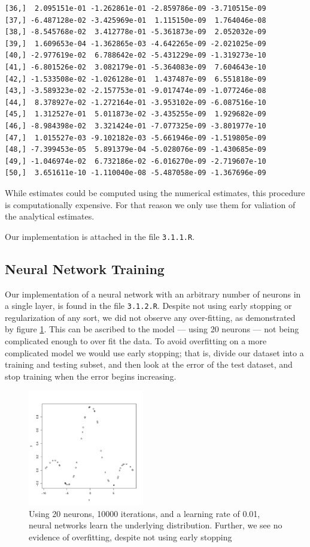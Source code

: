\documentclass[11pt]{article}
\begin{document}
\begin{lstlisting}
[36,]  2.095151e-01 -1.262861e-01 -2.859786e-09 -3.710515e-09
[37,] -6.487128e-02 -3.425969e-01  1.115150e-09  1.764046e-08
[38,] -8.545768e-02  3.412778e-01 -5.361873e-09  2.052032e-09
[39,]  1.609653e-04 -1.362865e-03 -4.642265e-09 -2.021025e-09
[40,] -2.977619e-02  6.788642e-02 -5.431229e-09 -1.319273e-10
[41,] -6.801526e-02  3.082179e-01 -5.364083e-09  7.604643e-10
[42,] -1.533508e-02 -1.026128e-01  1.437487e-09  6.551818e-09
[43,] -3.589323e-02 -2.157753e-01 -9.017474e-09 -1.077246e-08
[44,]  8.378927e-02 -1.272164e-01 -3.953102e-09 -6.087516e-10
[45,]  1.312527e-01  5.011873e-02 -3.435255e-09  1.929682e-09
[46,] -8.984398e-02  3.321424e-01 -7.077325e-09 -3.801977e-10
[47,]  1.015527e-03 -9.102182e-03 -5.661946e-09 -1.519805e-09
[48,] -7.399453e-05  5.891379e-04 -5.028076e-09 -1.430685e-09
[49,] -1.046974e-02  6.732186e-02 -6.016270e-09 -2.719607e-10
[50,]  3.651611e-10 -1.110040e-08 -5.487058e-09 -1.367696e-09
\end{lstlisting}
While estimates could be computed using the numerical estimates, this procedure is computationally expensive. For that reason we only use them for valiation of the analytical estimates. 

Our implementation is attached in the file \texttt{3.1.1.R}.

\subsection{Neural Network Training}
Our implementation of a neural network with an arbitrary number of neurons in a single layer, is found in the file \texttt{3.1.2.R}. Despite not using early stopping or regularization of any sort, we did not observe any over-fitting, as demonstrated by figure \ref{goodplot}. This can be ascribed to the model --- using 20 neurons --- not being complicated enough to over fit the data. To avoid overfitting on a more complicated model we would use early stopping; that is, divide our dataset into a training and testing subset, and then look at the error of the test dataset, and stop training when the error begins increasing. 

\begin{figure}[h!]
  \centering
\includegraphics[width=0.45\textwidth]{out-001-10000-20.pdf}
\caption{Using 20 neurons, 10000 iterations, and a learning rate of 0.01, neural networks learn the underlying distribution. Further, we see no evidence of overfitting, despite not using early stopping}
\label{goodplot}
\end{figure}
\end{document}
